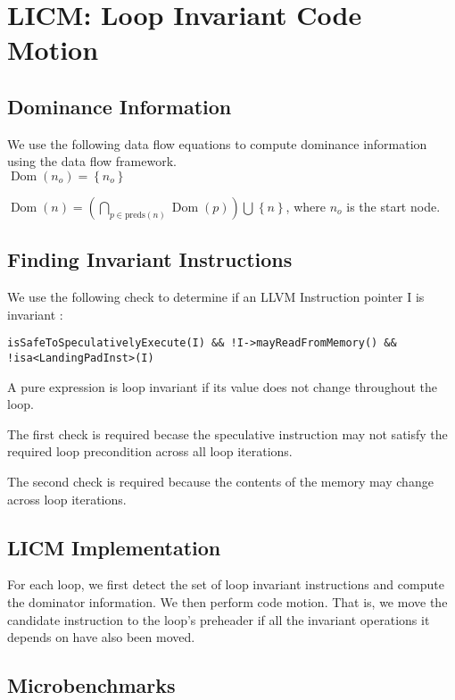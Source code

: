 \section{LICM: Loop Invariant Code Motion}

\subsection{Dominance Information}

We use the following data flow equations to compute dominance information using the
data flow framework. \\

$\operatorname{Dom}(n_o) = \left \{ n_o \right \}$

$\operatorname{Dom}(n) = \left ( \bigcap_{p \in \text{preds}(n)}^{} \operatorname{Dom}(p) \right ) \bigcup^{} \left \{ n \right \}$,
where $n_o$ is the start node.

\subsection{Finding Invariant Instructions}

We use the following check to determine if an LLVM Instruction pointer I is invariant :

\texttt{isSafeToSpeculativelyExecute(I) \&\& !I->mayReadFromMemory() \&\& !isa<LandingPadInst>(I)}

A pure expression is loop invariant if its value does not change throughout the loop. 

The first check is required becase the speculative instruction may not satisfy the required
loop precondition across all loop iterations.

The second check is required because the contents of the memory may change across loop iterations.

\subsection{LICM Implementation}

For each loop, we first detect the set of loop invariant instructions and compute
the dominator information. We then perform code motion. That is, we move the candidate instruction
to the loop's preheader if all the invariant operations it depends on have also been moved.

\subsection{Microbenchmarks}

